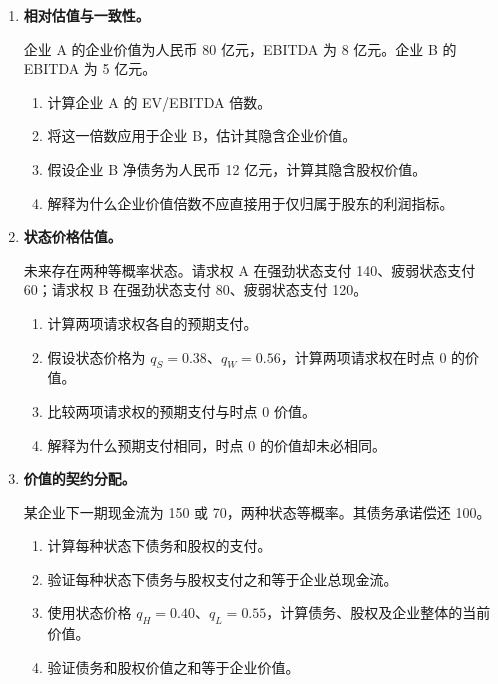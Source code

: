 \begin{enumerate}
\begin{enumerate}
\end{enumerate}


\item \textbf{相对估值与一致性。}

企业 A 的企业价值为人民币 80 亿元，EBITDA 为 8 亿元。企业 B 的 EBITDA 为 5 亿元。

\begin{enumerate}

\item 计算企业 A 的 EV/EBITDA 倍数。

\item 将这一倍数应用于企业 B，估计其隐含企业价值。

\item 假设企业 B 净债务为人民币 12 亿元，计算其隐含股权价值。

\item 解释为什么企业价值倍数不应直接用于仅归属于股东的利润指标。

\end{enumerate}


\item \textbf{状态价格估值。}

未来存在两种等概率状态。请求权 A 在强劲状态支付 140、疲弱状态支付 60；请求权 B 在强劲状态支付 80、疲弱状态支付 120。

\begin{enumerate}

\item 计算两项请求权各自的预期支付。

\item 假设状态价格为 $q_S=0.38$、$q_W=0.56$，计算两项请求权在时点 0 的价值。

\item 比较两项请求权的预期支付与时点 0 价值。

\item 解释为什么预期支付相同，时点 0 的价值却未必相同。

\end{enumerate}


\item \textbf{价值的契约分配。}

某企业下一期现金流为 150 或 70，两种状态等概率。其债务承诺偿还 100。

\begin{enumerate}

\item 计算每种状态下债务和股权的支付。

\item 验证每种状态下债务与股权支付之和等于企业总现金流。

\item 使用状态价格 $q_H=0.40$、$q_L=0.55$，计算债务、股权及企业整体的当前价值。

\item 验证债务和股权价值之和等于企业价值。

\end{enumerate}

\end{enumerate}

